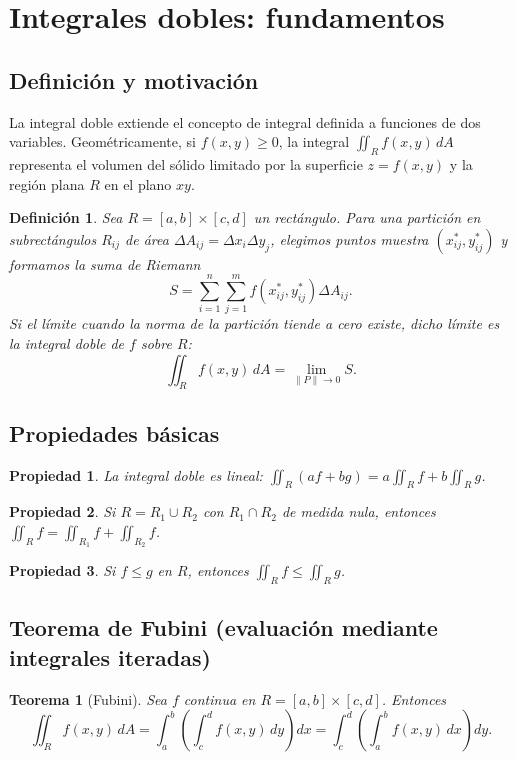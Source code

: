 \documentclass[12pt,spanish]{article}
\newtheorem{definicion}{Definición}[section]
\newtheorem{teorema}{Teorema}[section]
\newtheorem{propiedad}{Propiedad}[section]
\begin{document}
\section{Integrales dobles: fundamentos}

\subsection{Definición y motivación}

La integral doble extiende el concepto de integral definida a funciones de dos variables. Geométricamente, si $f(x,y)\ge 0$, la integral $\iint_R f(x,y)\,dA$ representa el volumen del sólido limitado por la superficie $z=f(x,y)$ y la región plana $R$ en el plano $xy$.

\begin{definicion}
Sea $R=[a,b]\times[c,d]$ un rectángulo. Para una partición en subrectángulos $R_{ij}$ de área $\Delta A_{ij}=\Delta x_i\Delta y_j$, elegimos puntos muestra $(x_{ij}^*,y_{ij}^*)$ y formamos la suma de Riemann
\[
S=\sum_{i=1}^n\sum_{j=1}^m f(x_{ij}^*,y_{ij}^*)\Delta A_{ij}.
\]
Si el límite cuando la norma de la partición tiende a cero existe, dicho límite es la integral doble de $f$ sobre $R$:
\[
\iint_R f(x,y)\,dA = \lim_{\|P\|\to0} S.
\]
\end{definicion}

\subsection{Propiedades básicas}
\begin{propiedad}
La integral doble es lineal: $\iint_R (af+bg)=a\iint_R f+b\iint_R g$.
\end{propiedad}
\begin{propiedad}
Si $R=R_1\cup R_2$ con $R_1\cap R_2$ de medida nula, entonces $\iint_R f = \iint_{R_1}f+\iint_{R_2}f$.
\end{propiedad}
\begin{propiedad}
Si $f\le g$ en $R$, entonces $\iint_R f \le \iint_R g$.
\end{propiedad}

\subsection{Teorema de Fubini (evaluación mediante integrales iteradas)}
\begin{teorema}[Fubini]
Sea $f$ continua en $R=[a,b]\times[c,d]$. Entonces
\[
\iint_R f(x,y)\,dA = \int_a^b \left(\int_c^d f(x,y)\,dy\right)dx = \int_c^d \left(\int_a^b f(x,y)\,dx\right)dy.
\]
\end{teorema}
\end{document}
